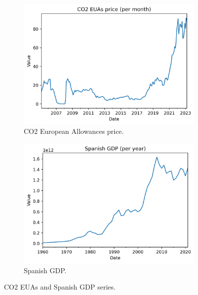 \begin{figure}[H]
\centering
    \begin{subfigure}{.45\textwidth}
        \centering
        \includegraphics[width=1\linewidth]{images/variable_analysis/co2_m_all}
        \caption{CO2 European Allowances price.}
        \label{fig:c02-euas-series}
    \end{subfigure}
    \begin{subfigure}{.45\textwidth}
        \centering
        \includegraphics[width=1\linewidth]{images/variable_analysis/gdp_y_all}
        \caption{Spanish GDP.}
        \label{fig:gdp-series}
    \end{subfigure}

    \caption{CO2 EUAs and Spanish GDP series.}
    \label{fig:co2-gdp-analysis}
\end{figure}


